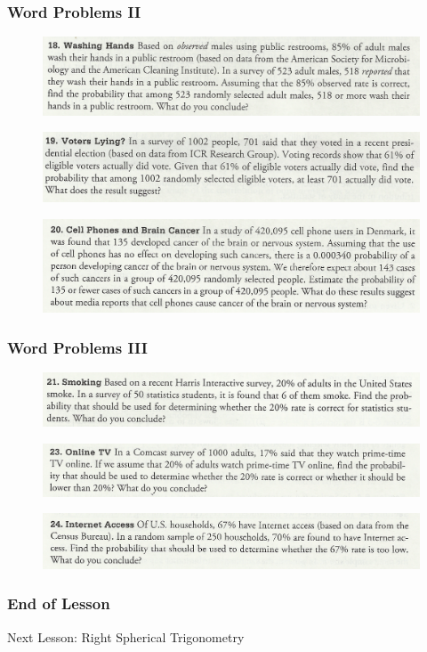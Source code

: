 \documentclass[xcolor=dvipsnames]{beamer}
\begin{document}
\begin{frame}
  \frametitle{Word Problems II}
  \begin{figure}[h]
    \includegraphics[scale=.7]{./triola1.png}
  \end{figure}
  \begin{figure}[h]
    \includegraphics[scale=.7]{./triola2.png}
  \end{figure}
  \begin{figure}[h]
    \includegraphics[scale=.7]{./triola3.png}
  \end{figure}
\end{frame}

\begin{frame}
  \frametitle{Word Problems III}
  \begin{figure}[h]
    \includegraphics[scale=.7]{./triola4.png}
  \end{figure}
  \begin{figure}[h]
    \includegraphics[scale=.7]{./triola5.png}
  \end{figure}
  \begin{figure}[h]
    \includegraphics[scale=.7]{./triola6.png}
  \end{figure}
\end{frame}

\begin{frame}
  \frametitle{End of Lesson}
Next Lesson: Right Spherical Trigonometry
\end{frame}
\end{document}
